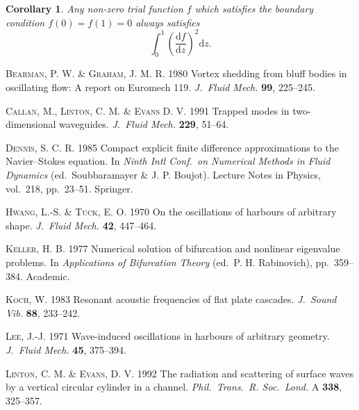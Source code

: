 \documentclass{jfm}
\newtheorem{corollary}{Corollary}
\begin{document}
\begin{corollary}
Any non-zero trial function $f$ which satisfies the boundary condition
$f(0)=f(1)=0$ always satisfies
\begin{equation}
  \int_0^1 \left( \frac{\mathrm{d} f}{\mathrm{d} z} \right)^2 \mathrm{d} z.
\end{equation}
\end{corollary}

\begin{thebibliography}{}

     \textsc{Bearman, P. W. \& Graham, J. M. R.} 1980
     {Vortex shedding from bluff bodies in oscillating flow:
     A report on Euromech 119.}
     \textit{J.~Fluid Mech.} \textbf{99}, 225--245.

     \textsc{Callan, M., Linton, C. M. \& Evans D. V.} 1991
     {Trapped modes in two-dimensional wave\-guides.}
     \textit{J.~Fluid Mech.} \textbf{229}, 51--64.

     \textsc{Dennis, S. C. R.} 1985 Compact explicit finite difference
     approximations to the Navier--Stokes equation. In \textit{Ninth Intl
     Conf.\ on Numerical Methods in Fluid Dynamics} (ed.\ Soubbaramayer
     \& J. P. Boujot). Lecture Notes in Physics, vol.\ 218,
     pp.\ 23--51. Springer.

     \textsc{Hwang, L.-S. \& Tuck, E. O.} 1970
     {On the oscillations of harbours of arbitrary shape.}
     \textit{J.~Fluid Mech.} \textbf{42}, 447--464.

     \textsc{Keller, H. B.} 1977 Numerical solution of bifurcation and
     nonlinear eigenvalue problems. In \textit{Applications of Bifurcation
     Theory} (ed.\ P. H. Rabinovich), pp.\ 359--384. Academic.

     \textsc{Koch, W.} 1983 {Resonant acoustic frequencies of flat plate
     cascades.} \textit{J.~Sound Vib.} \textbf{88}, 233--242.

     \textsc{Lee, J.-J.} 1971 {Wave-induced oscillations in harbours of
     arbitrary geometry.} \textit{J.~Fluid Mech.} \textbf{45}, 375--394.

     \textsc{Linton, C. M. \& Evans, D. V.} 1992 {The radiation
     and scattering of surface waves by a vertical circular cylinder
     in a channel.}
     \textit{Phil.\ Trans.\ R. Soc.\ Lond.} A \textbf{338}, 325--357.


\end{thebibliography}
\end{document}
